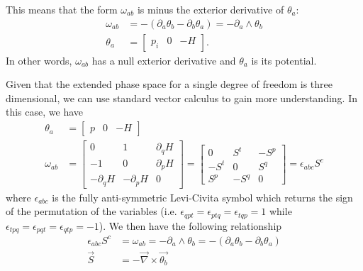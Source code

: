 This means that the form $\omega_{ab}$ is minus the exterior derivative of $\theta_a$:
\begin{equation}\label{rp-cm-lm-formPotential}
	\begin{aligned}
	\omega_{ab} &= - (\partial_a \theta_b - \partial_b \theta_a) = - \partial_a \wedge \theta_b \\
\theta_a &= \begin{bmatrix}
	p_i & 0 & - H
\end{bmatrix}.
	\end{aligned}
\end{equation}
In other words, $\omega_{ab}$ has a null exterior derivative and $\theta_a$ is its potential.

Given that the extended phase space for a single degree of freedom is three dimensional, we can use standard vector calculus to gain more understanding. In this case, we have
\begin{equation}
	\begin{aligned}
	\theta_a &= \begin{bmatrix}
		p & 0 & - H
	\end{bmatrix} \\
\omega_{ab} &= \left[\begin{array}{ccc}
	0 & 1 & \partial_{q} H \\
	- 1 & 0 & \partial_{p} H \\
	- \partial_{q} H & -\partial_{p} H & 0
\end{array} \right]
= \left[\begin{array}{ccc}
	0 & S^t & - S^p \\
	- S^t & 0 & S^q \\
	S^p & - S^q & 0
\end{array} \right] = \epsilon_{abc}S^c
	\end{aligned}
\end{equation}
where $\epsilon_{abc}$ is the fully anti-symmetric Levi-Civita symbol which returns the sign of the permutation of the variables (i.e. $\epsilon_{qpt} = \epsilon_{ptq} = \epsilon_{tqp} = 1$ while $\epsilon_{tpq} = \epsilon_{pqt} = \epsilon_{qtp} = -1$). We then have the following relationship
\begin{equation}\label{rp-cm-lm-displacementFormComponents}
	\begin{aligned}
	\epsilon_{abc}S^c &= \omega_{ab} = - \partial_a \wedge \theta_b = - (\partial_a \theta_b - \partial_b \theta_a) \\
	\vec{S} &= - \vec{\nabla} \times \vec{\theta_b} \\
	\end{aligned}
\end{equation}

